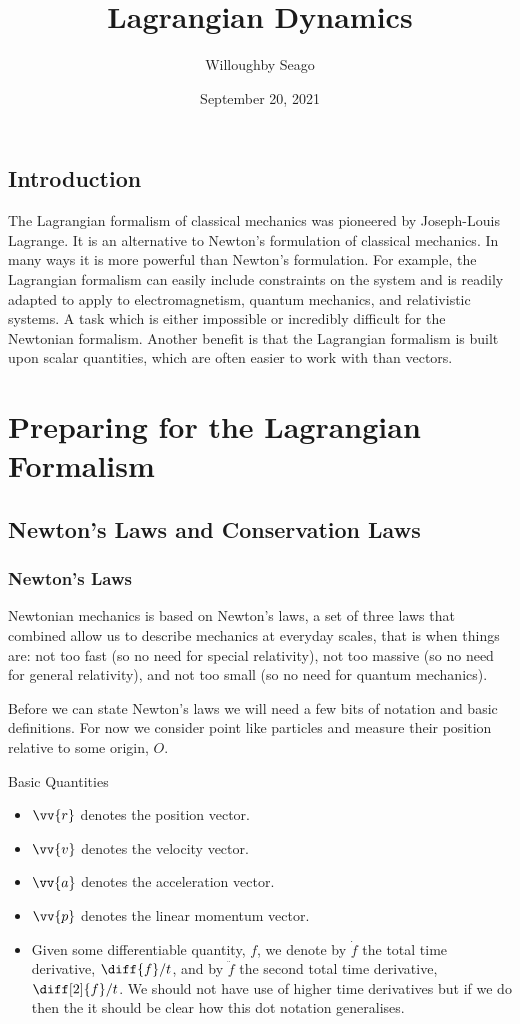 \documentclass[fleqn]{NotesClass}
\title{Lagrangian Dynamics}
\author{Willoughby Seago}
\date{September 20, 2021}
\begin{document}
    \frontmatter
    \titlepage
    \tableofcontents
    \mainmatter
    \chapter{Introduction}
    The Lagrangian formalism of classical mechanics was pioneered by Joseph-Louis Lagrange.
    It is an alternative to Newton's formulation of classical mechanics.
    In many ways it is more powerful than Newton's formulation.
    For example, the Lagrangian formalism can easily include constraints on the system and is readily adapted to apply to electromagnetism, quantum mechanics, and relativistic systems.
    A task which is either impossible or incredibly difficult for the Newtonian formalism.
    Another benefit is that the Lagrangian formalism is built upon scalar quantities, which are often easier to work with than vectors.
    
    \part{Preparing for the Lagrangian Formalism}
    \chapter{Newton's Laws and Conservation Laws}
    \section{Newton's Laws}
    Newtonian mechanics is based on Newton's laws, a set of three laws that combined allow us to describe mechanics at everyday scales, that is when things are: not too fast (so no need for special relativity), not too massive (so no need for general relativity), and not too small (so no need for quantum mechanics).
    
    Before we can state Newton's laws we will need a few bits of notation and basic definitions.
    For now we consider point like particles and measure their position relative to some origin, \(O\).
    \begin{ntn}{Basic Quantities}{}
        \begin{itemize}
            \item \(\vv{r}\) denotes the position vector.
            \item \(\vv{v}\) denotes the velocity vector.
            \item \(\vv{a}\) denotes the acceleration vector.
            \item \(\vv{p}\) denotes the linear momentum vector.
            \item Given some differentiable quantity, \(f\), we denote by \(\dot{f}\) the total time derivative, \(\diff{f}/{t}\), and by \(\ddot{f}\) the second total time derivative, \(\diff[2]{f}/{t}\).
            We should not have use of higher time derivatives but if we do then the it should be clear how this dot notation generalises.
        \end{itemize}
    \end{ntn}
    
\end{document}
